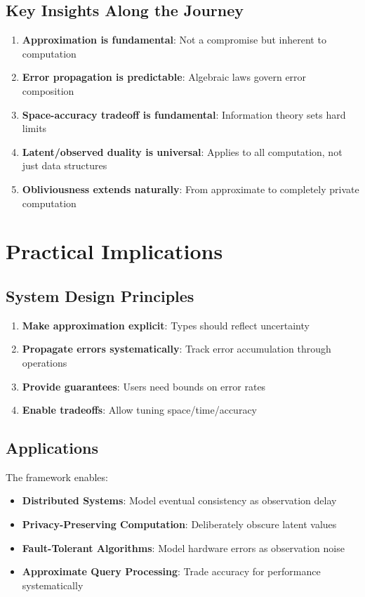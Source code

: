 \subsection{Key Insights Along the Journey}

\begin{enumerate}
\item \textbf{Approximation is fundamental}: Not a compromise but inherent to computation
\item \textbf{Error propagation is predictable}: Algebraic laws govern error composition
\item \textbf{Space-accuracy tradeoff is fundamental}: Information theory sets hard limits
\item \textbf{Latent/observed duality is universal}: Applies to all computation, not just data structures
\item \textbf{Obliviousness extends naturally}: From approximate to completely private computation
\end{enumerate}

\section{Practical Implications}

\subsection{System Design Principles}

\begin{enumerate}
\item \textbf{Make approximation explicit}: Types should reflect uncertainty
\item \textbf{Propagate errors systematically}: Track error accumulation through operations
\item \textbf{Provide guarantees}: Users need bounds on error rates
\item \textbf{Enable tradeoffs}: Allow tuning space/time/accuracy
\end{enumerate}

\subsection{Applications}

The framework enables:
\begin{itemize}
\item \textbf{Distributed Systems}: Model eventual consistency as observation delay
\item \textbf{Privacy-Preserving Computation}: Deliberately obscure latent values
\item \textbf{Fault-Tolerant Algorithms}: Model hardware errors as observation noise
\item \textbf{Approximate Query Processing}: Trade accuracy for performance systematically
\end{itemize}

